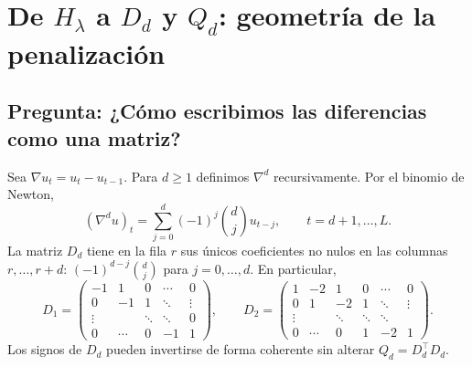 \documentclass[11pt,letterpaper,parskip=half,headings=small]{scrartcl}
\theoremstyle{definition}\newtheorem{definicion}[proposicion]{Definición}
\theoremstyle{remark}\newtheorem{observacion}[proposicion]{Observación}
\newcommand{\pregunta}[1]{\subsection{Pregunta: #1}}
\begin{document}
\section{De $H_\lambda$ a $D_d$ y $Q_d$: geometría de la penalización}
\pregunta{¿Cómo escribimos las diferencias como una matriz?}
Sea $\nabla u_t=u_t-u_{t-1}$. Para $d\geq1$ definimos $\nabla^d$ recursivamente. Por el binomio de Newton,
\begin{equation}\label{eq:diff-bin}
(\nabla^du)_t=\sum_{j=0}^d(-1)^j\binom dj u_{t-j},\qquad t=d+1,\ldots,L.
\end{equation}
La matriz $D_d$ tiene en la fila $r$ sus únicos coeficientes no nulos en las columnas $r,\ldots,r+d$: $(-1)^{d-j}\binom dj$ para $j=0,\ldots,d$. En particular,
\[
D_1=\begin{pmatrix}-1&1&0&\cdots&0\\0&-1&1&\ddots&\vdots\\\vdots&&\ddots&\ddots&0\\0&\cdots&0&-1&1\end{pmatrix},
\qquad
D_2=\begin{pmatrix}1&-2&1&0&\cdots&0\\0&1&-2&1&\ddots&\vdots\\\vdots&&\ddots&\ddots&\ddots\\0&\cdots&0&1&-2&1\end{pmatrix}.
\]
Los signos de $D_d$ pueden invertirse de forma coherente sin alterar $Q_d=D_d^\top D_d$.
\end{document}
